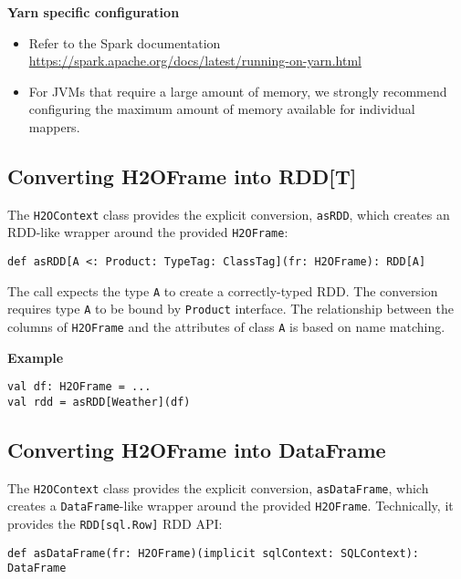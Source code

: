 \pagebreak
\textbf{Yarn specific configuration}

\begin{itemize}
\item Refer to the Spark documentation \url{https://spark.apache.org/docs/latest/running-on-yarn.html}
\item For JVMs that require a large amount of memory, we strongly recommend configuring the maximum amount of memory available for individual mappers.
 \end{itemize} 
 
 \subsection{Converting H2OFrame into RDD[T]}
 
 The \texttt{H2OContext} class provides the explicit conversion, \texttt{asRDD}, which creates an RDD-like wrapper around the provided \texttt{H2OFrame}:

\begin{lstlisting}[style=Scala]
def asRDD[A <: Product: TypeTag: ClassTag](fr: H2OFrame): RDD[A]
\end{lstlisting}

The call expects the type \texttt{A} to create a correctly-typed RDD. The conversion requires type \texttt{A} to be bound by \texttt{Product} interface. The relationship between the columns of \texttt{H2OFrame} and the attributes of class \texttt{A} is based on name matching.

\textbf{Example}

\begin{lstlisting}[style=Scala]
val df: H2OFrame = ...
val rdd = asRDD[Weather](df)
\end{lstlisting}

\subsection{Converting H2OFrame into DataFrame}

The \texttt{H2OContext} class provides the explicit conversion, \texttt{asDataFrame}, which creates a \texttt{DataFrame}-like wrapper around the provided \texttt{H2OFrame}. Technically, it provides the \texttt{RDD[sql.Row]} RDD API:

\begin{lstlisting}[style=Scala]
def asDataFrame(fr: H2OFrame)(implicit sqlContext: SQLContext): DataFrame
\end{lstlisting}

